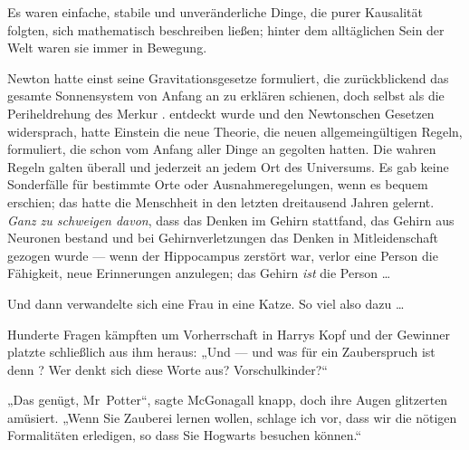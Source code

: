 Es waren einfache, stabile und unveränderliche Dinge, die purer Kausalität folgten, sich mathematisch beschreiben ließen; hinter dem alltäglichen Sein der Welt waren sie immer in Bewegung.

Newton hatte einst seine Gravitationsgesetze formuliert, die zurückblickend das gesamte Sonnensystem von Anfang an zu erklären schienen, doch selbst als die Periheldrehung des Merkur%
.
entdeckt wurde und den Newtonschen Gesetzen widersprach, hatte Einstein die neue Theorie, die neuen allgemeingültigen Regeln, formuliert, die schon vom Anfang aller Dinge an gegolten hatten. Die wahren Regeln galten überall und jederzeit an jedem Ort des Universums. Es gab keine Sonderfälle für bestimmte Orte oder Ausnahmeregelungen, wenn es bequem erschien; das hatte die Menschheit in den letzten dreitausend Jahren gelernt. \emph{Ganz zu schweigen davon}, dass das Denken im Gehirn stattfand, das Gehirn aus Neuronen bestand und bei Gehirnverletzungen das Denken in Mitleidenschaft gezogen wurde — wenn der Hippocampus zerstört war, verlor eine Person die Fähigkeit, neue Erinnerungen anzulegen; das Gehirn \emph{ist} die Person …

Und dann verwandelte sich eine Frau in eine Katze. So viel also dazu …

Hunderte Fragen kämpften um Vorherrschaft in Harrys Kopf und der Gewinner platzte schließlich aus ihm heraus:
„Und — und was für ein Zauberspruch ist denn ? Wer denkt sich diese Worte aus? Vorschulkinder?“

„Das genügt, Mr~Potter“, sagte McGonagall knapp, doch ihre Augen glitzerten amüsiert.
„Wenn Sie Zauberei lernen wollen, schlage ich vor, dass wir die nötigen Formalitäten erledigen, so dass Sie Hogwarts besuchen können.“

